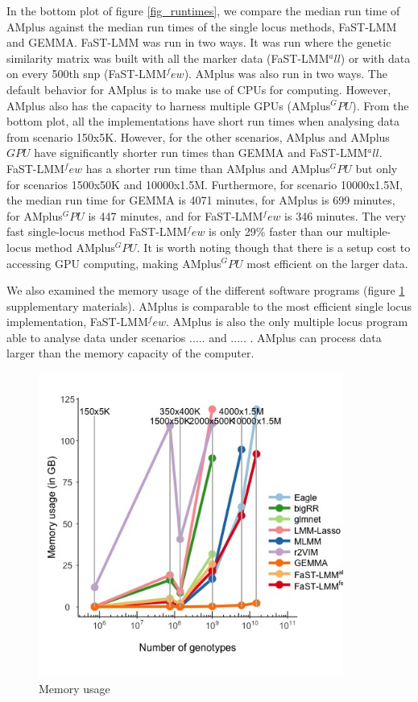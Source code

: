 \documentclass{nature}
\begin{document}
In the bottom plot of figure \ref{fig_runtimes}, we compare the median run time of AMplus against the median run times of the single locus methods, FaST-LMM and GEMMA. 
FaST-LMM was run in two ways. It was run where the genetic similarity matrix was built with all the marker data (FaST-LMM$^all$) or with data on every 500th snp (FaST-LMM$^few$). 
AMplus was also run in two ways.  The default behavior for AMplus is to make use of CPUs for computing. However, AMplus also has the capacity to harness multiple GPUs (AMplus$^GPU$). 
From the bottom plot, all the implementations have short run times when analysing data from scenario 150x5K. However, for the other scenarios, AMplus and AMplus$GPU$ have 
significantly shorter run times than GEMMA and FaST-LMM$^all$. FaST-LMM$^few$ has a shorter run time than AMplus and AMplus$^GPU$ but only for scenarios 1500x50K and 
10000x1.5M.  Furthermore, for scenario 10000x1.5M, the median run time for GEMMA is 4071 minutes, for AMplus is 699 minutes, for AMplus$^GPU$ is 447 minutes, and for 
FaST-LMM$^few$ is 346 minutes. The very fast single-locus method FaST-LMM$^few$ is only 29\% faster than our multiple-locus method AMplus$^GPU$. It is worth noting though that 
there is a setup cost to accessing GPU computing, making AMplus$^GPU$ most efficient on the larger data. 


We also examined the memory usage of the different software programs (figure \ref{fig_memory} supplementary materials). 
AMplus is comparable to the most efficient single locus implementation, FaST-LMM$^few$. 
AMplus is also the only multiple locus program able to analyse data under scenarios ..... and ..... . 
AMplus can process data larger than the memory capacity of the computer.

\begin{figure}
\label{fig_memory}
\caption{Memory usage}
\includegraphics[width=10cm]{mem}
\end{figure}
\end{document}

